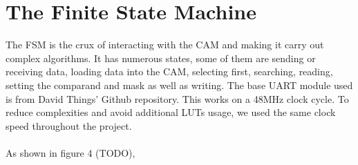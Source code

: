 \section{The Finite State Machine}
The FSM is the crux of interacting with the CAM and making it carry out complex algorithms. 
It has numerous states, some of them are sending or receiving data, loading data into the CAM, selecting first, searching, reading, setting the comparand and mask as well as writing. 
The base UART module used is from David Things' Github repository. \cite{uart} This works on a 48MHz clock cycle.
To reduce complexities and avoid additional LUTs usage, we used the same clock speed throughout the project. 
\\\\
As shown in figure 4 (TODO), 